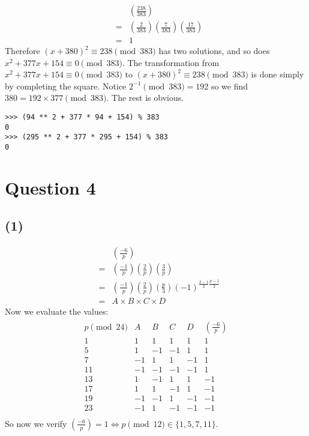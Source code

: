 \documentclass{article}
\begin{document}
\begin{eqnarray*}
  & & \left(\frac{238}{383}\right) \\
  &=& \left(\frac{2}{383}\right)\left(\frac{7}{383}\right)\left(\frac{17}{383}\right) \\
  &=& 1
\end{eqnarray*}
Therefore $ (x + 380)^2 \equiv 238 \pmod{383} $ has two solutions, and so does $ x^2 + 377x + 154 \equiv 0 \pmod{383} $. The transformation from $ x^2 + 377x + 154 \equiv 0 \pmod{383} $ to $ (x + 380)^2 \equiv 238 \pmod{383} $ is done simply by completing the square. Notice $ 2^{-1} \pmod{383} = 192 $ so we find $ 380 = 192 \times 377 \pmod{383} $. The rest is obvious.

\begin{verbatim}
>>> (94 ** 2 + 377 * 94 + 154) % 383
0
>>> (295 ** 2 + 377 * 295 + 154) % 383
0
\end{verbatim}

\section*{Question 4}
\subsection*{(1)}
\begin{eqnarray*}
  & & \left(\frac{-6}{p}\right) \\
  &=& \left(\frac{-1}{p}\right)\left(\frac{2}{p}\right)\left(\frac{3}{p}\right) \\
  &=& \left(\frac{-1}{p}\right)\left(\frac{2}{p}\right)\left(\frac{p}{3}\right)(-1)^{\frac{3-1}{2}\frac{p-1}{2}} \\
  &=& A \times B \times C \times D
\end{eqnarray*}
Now we evaluate the values:
\begin{eqnarray*}
  \begin{array}{cccccc}
    p \pmod{24}  &  A &  B &  C &  D & \left(\frac{-6}{p}\right) \\
               1 &  1 &  1 &  1 &  1 &  1 \\
               5 &  1 & -1 & -1 &  1 &  1 \\
               7 & -1 &  1 &  1 & -1 &  1 \\
              11 & -1 & -1 & -1 & -1 &  1 \\
              13 &  1 & -1 &  1 &  1 & -1 \\
              17 &  1 &  1 & -1 &  1 & -1 \\
              19 & -1 & -1 &  1 & -1 & -1 \\
              23 & -1 &  1 & -1 & -1 & -1 \\
  \end{array}
\end{eqnarray*}
So now we verify $ \left(\frac{-6}{p}\right) = 1 \iff p \pmod{12} \in \{1, 5, 7, 11\}$.
\end{document}
